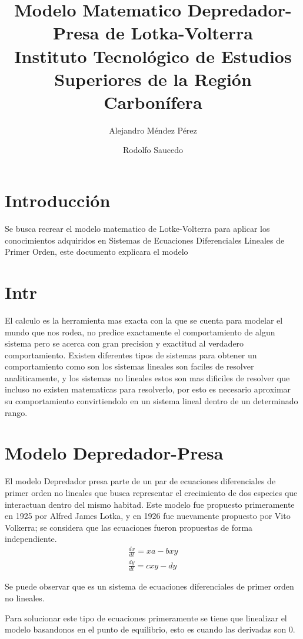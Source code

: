 \documentclass{report}
\title{
	{Modelo Matematico Depredador-Presa de Lotka-Volterra}\\
	{\large Instituto Tecnológico de Estudios Superiores de la Región Carbonífera}\\
}
\author{Alejandro Méndez Pérez \and Rodolfo Saucedo}
\begin{document}

\maketitle
\newpage
\tableofcontents
\chapter*{Introducción}
Se busca recrear el modelo matematico de Lotke-Volterra para aplicar los conocimientos adquiridos en Sistemas de Ecuaciones Diferenciales Lineales de Primer Orden, este documento explicara el modelo

\chapter*{Intr}
El calculo es la herramienta mas exacta con la que se cuenta para modelar el mundo que nos rodea, no predice exactamente el comportamiento de algun sistema pero se acerca con gran precision y exactitud al verdadero comportamiento. Existen diferentes tipos de sistemas para obtener un comportamiento como son los sistemas lineales son faciles de resolver analiticamente, y los sistemas no lineales estos son mas dificiles de resolver que incluso no existen matematicas para resolverlo, por esto es necesario aproximar su comportamiento convirtiendolo en un sistema lineal dentro de un determinado rango.

\chapter{Modelo Depredador-Presa}

El modelo Depredador presa parte de un par de ecuaciones diferenciales de primer orden no lineales que busca representar el crecimiento de dos especies que interactuan dentro del mismo habitad.
Este modelo fue propuesto primeramente en 1925 por Alfred James Lotka, y en 1926 fue nuevamente propuesto por Vito Volkerra; se considera que las ecuaciones fueron propuestas de forma independiente.
\begin{align}
\frac{dx}{dt}= xa-bxy  \\
\frac{dy}{dt}= cxy-dy
\end{align}

Se puede observar que es un sistema de ecuaciones diferenciales de primer orden no lineales.

Para solucionar este tipo de ecuaciones primeramente se tiene que linealizar el modelo basandonos en el punto de equilibrio, esto es cuando las derivadas son 0.
\end{document}
